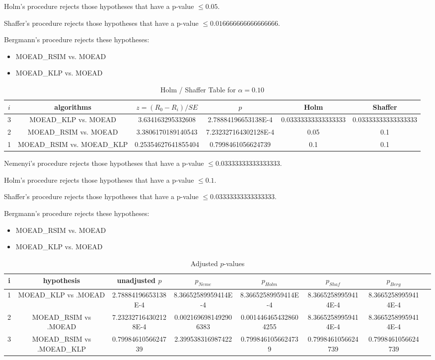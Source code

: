 \documentclass[a4paper,10pt]{article}
\begin{document}
\begin{landscape}
Holm's procedure rejects those hypotheses that have a p-value $\le0.05$.


Shaffer's procedure rejects those hypotheses that have a p-value $\le0.016666666666666666$.


Bergmann's procedure rejects these hypotheses:


\begin{itemize}


\item MOEAD_RSIM vs. MOEAD
\item MOEAD_KLP vs. MOEAD
\end{itemize}


\begin{table}[!htp]
\centering\tiny
\caption{Holm / Shaffer Table for $\alpha=0.10$}
\begin{tabular}{cccccc}
$i$&algorithms&$z=(R_0 - R_i)/SE$&$p$&Holm&Shaffer\\
\hline
3&MOEAD_KLP vs. MOEAD&3.634163295332608&2.78884196653138E-4&0.03333333333333333&0.03333333333333333\\
2&MOEAD_RSIM vs. MOEAD&3.3806170189140543&7.232327164302128E-4&0.05&0.1\\
1&MOEAD_RSIM vs. MOEAD_KLP&0.25354627641855404&0.7998461056624739&0.1&0.1\\
\hline
\end{tabular}
\end{table}
Nemenyi's procedure rejects those hypotheses that have a p-value $\le0.03333333333333333$.


Holm's procedure rejects those hypotheses that have a p-value $\le0.1$.


Shaffer's procedure rejects those hypotheses that have a p-value $\le0.03333333333333333$.


Bergmann's procedure rejects these hypotheses:


\begin{itemize}


\item MOEAD_RSIM vs. MOEAD
\item MOEAD_KLP vs. MOEAD
\end{itemize}


\begin{table}[!htp]
\centering\tiny
\caption{Adjusted $p$-values}
\begin{tabular}{cccccccc}
i&hypothesis&unadjusted $p$&$p_{Neme}$&$p_{Holm}$&$p_{Shaf}$&$p_{Berg}$\\
\hline
1&MOEAD_KLP vs .MOEAD&2.78884196653138E-4&8.36652589959414E-4&8.36652589959414E-4&8.36652589959414E-4&8.36652589959414E-4\\
2&MOEAD_RSIM vs .MOEAD&7.232327164302128E-4&0.0021696981492906383&0.0014464654328604255&8.36652589959414E-4&8.36652589959414E-4\\
3&MOEAD_RSIM vs .MOEAD_KLP&0.7998461056624739&2.399538316987422&0.7998461056624739&0.7998461056624739&0.7998461056624739\\
\hline
\end{tabular}
\end{table}

\end{landscape}
\end{document}
